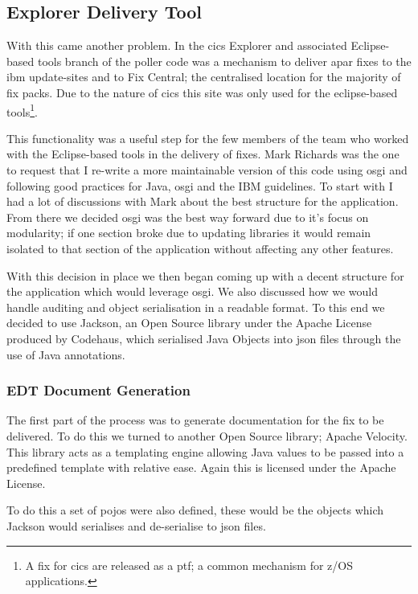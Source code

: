 \documentclass[a4paper,11pt]{report}
\begin{document}
\subsection{Explorer Delivery Tool}

With this came another problem. In the \gls{cics} Explorer and associated Eclipse-based tools 
branch of the poller code was a mechanism to deliver \gls{apar} fixes to the \gls{ibm} 
update-sites and to Fix Central; the centralised location for the majority of fix packs. Due to the
nature of \gls{cics} this site was only used for the eclipse-based tools\footnote{A fix for 
\gls{cics} are released as a \gls{ptf}; a common mechanism for z/OS applications.}.

This functionality was a useful step for the few members of the team who worked with the 
Eclipse-based tools in the delivery of fixes. Mark Richards was the one to request that I re-write
a more maintainable version of this code using \gls{osgi} and following good practices for Java,
\gls{osgi} and the IBM guidelines. To start with I had a lot of discussions with Mark about the 
best structure for the application. From there we decided \gls{osgi} was the best way forward due 
to it's focus on modularity; if one section broke due to updating libraries it would remain 
isolated to that section of the application without affecting any other features.

With this decision in place we then began coming up with a decent structure for the application
which would leverage \gls{osgi}. We also discussed how we would handle auditing and object 
serialisation in a readable format. To this end we decided to use Jackson, an Open Source library
under the Apache License produced by Codehaus, which serialised Java Objects into \gls{json} files
through the use of Java annotations. \\

\subsubsection{EDT Document Generation}

The first part of the process was to generate documentation for the fix to be delivered. To do this
we turned to another Open Source library; Apache Velocity. This library acts as a templating engine
allowing Java values to be passed into a predefined template with relative ease. Again this is
licensed under the Apache License.

To do this a set of \gls{pojo}s were also defined, these would be the objects which Jackson would
serialises and de-serialise to \gls{json} files. \\
\end{document}
